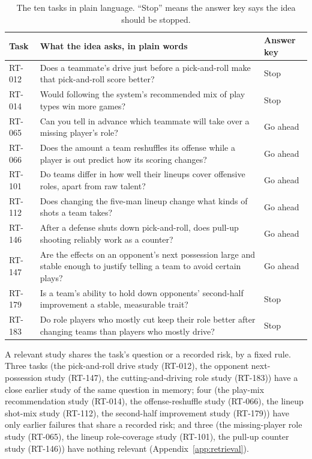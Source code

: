 \documentclass[11pt]{article}
\begin{document}
\begin{table}[ht]
\centering
\caption{The ten tasks in plain language. ``Stop'' means the answer key says the idea should be stopped.}
\label{tab:tasks_plain}
\small
\begin{tabularx}{\linewidth}{lXl}
\toprule
Task & What the idea asks, in plain words & Answer key \\
\midrule
RT-012 & Does a teammate's drive just before a pick-and-roll make that pick-and-roll score better? & Stop \\
RT-014 & Would following the system's recommended mix of play types win more games? & Stop \\
RT-065 & Can you tell in advance which teammate will take over a missing player's role? & Go ahead \\
RT-066 & Does the amount a team reshuffles its offense while a player is out predict how its scoring changes? & Go ahead \\
RT-101 & Do teams differ in how well their lineups cover offensive roles, apart from raw talent? & Go ahead \\
RT-112 & Does changing the five-man lineup change what kinds of shots a team takes? & Go ahead \\
RT-146 & After a defense shuts down pick-and-roll, does pull-up shooting reliably work as a counter? & Go ahead \\
RT-147 & Are the effects on an opponent's next possession large and stable enough to justify telling a team to avoid certain plays? & Go ahead \\
RT-179 & Is a team's ability to hold down opponents' second-half improvement a stable, measurable trait? & Stop \\
RT-183 & Do role players who mostly cut keep their role better after changing teams than players who mostly drive? & Stop \\
\bottomrule
\end{tabularx}

\end{table}



A relevant study shares the task's question or a recorded risk, by a fixed rule. Three tasks (the pick-and-roll drive study (RT-012), the opponent next-possession study (RT-147), the cutting-and-driving role study (RT-183)) have a close earlier study of the same question in memory; four (the play-mix recommendation study (RT-014), the offense-reshuffle study (RT-066), the lineup shot-mix study (RT-112), the second-half improvement study (RT-179)) have only earlier failures that share a recorded risk; and three (the missing-player role study (RT-065), the lineup role-coverage study (RT-101), the pull-up counter study (RT-146)) have nothing relevant (Appendix~\ref{app:retrieval}).
\end{document}
